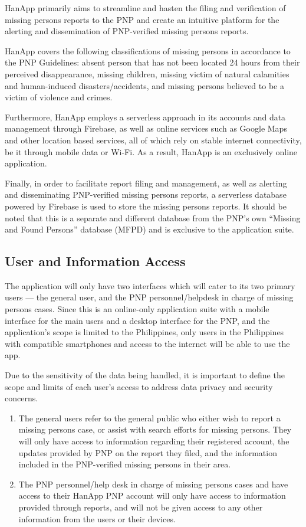 HanApp primarily aims to streamline and hasten the filing and verification of missing persons reports to the PNP and create an intuitive platform for the alerting and dissemination of PNP-verified missing persons reports.

HanApp covers the following classifications of missing persons in accordance to the PNP Guidelines: absent person that has not been located 24 hours from their perceived disappearance, missing children, missing victim of natural calamities and human-induced disasters/accidents, and missing persons believed to be a victim of violence and crimes.

Furthermore, HanApp employs a serverless approach in its accounts and data management through Firebase, as well as online services such as Google Maps and other location based services, all of which rely on stable internet connectivity, be it through mobile data or Wi-Fi. As a result, HanApp is an exclusively online application.

Finally, in order to facilitate report filing and management, as well as alerting and disseminating PNP-verified missing persons reports, a serverless database powered by Firebase is used to store the missing persons reports. It should be noted that this is a separate and different database from the PNP’s own “Missing and Found Persons” database (MFPD) and is exclusive to the application suite.

\subsection{User and Information Access}
\label{sec:userInfoAcccess}
The application will only have two interfaces which will cater to its two primary users — the general user, and the PNP personnel/helpdesk in charge of missing persons cases. Since this is an online-only application suite with a mobile interface for the main users and a desktop interface for the PNP, and the application’s scope is limited to the Philippines, only users in the Philippines with compatible smartphones and access to the internet will be able to use the app.

Due to the sensitivity of the data being handled, it is important to define the scope and limits of each user’s access to address data privacy and security concerns.

\begin{enumerate}
    \item The general users refer to the general public who either wish to report a missing persons case, or assist with search efforts for missing persons. They will only have access to information regarding their registered account, the updates provided by PNP on the report they filed, and the information included in the PNP-verified missing persons in their area.
    \item The PNP personnel/help desk in charge of missing persons cases and have access to their HanApp PNP account will only have access to information provided through reports, and will not be given access to any other information from the users or their devices.
\end{enumerate}

